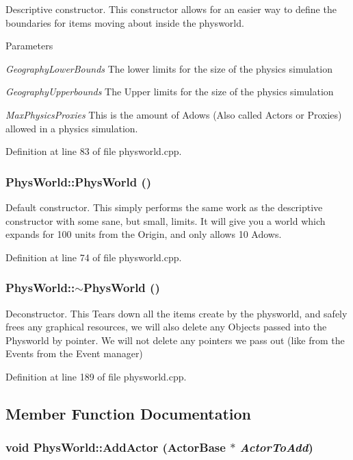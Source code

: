 Descriptive constructor. This constructor allows for an easier way to define the boundaries for items moving about inside the physworld. 
\begin{DoxyParams}{Parameters}
\item[{\em GeographyLowerBounds}]The lower limits for the size of the physics simulation \item[{\em GeographyUpperbounds}]The Upper limits for the size of the physics simulation \item[{\em MaxPhysicsProxies}]This is the amount of Adows (Also called Actors or Proxies) allowed in a physics simulation. \end{DoxyParams}


Definition at line 83 of file physworld.cpp.\hypertarget{classPhysWorld_a6ded8026b0cd72e7877830698197adf0}{
\subsubsection[{PhysWorld}]{\setlength{\rightskip}{0pt plus 5cm}PhysWorld::PhysWorld ()}}
\label{db/df5/classPhysWorld_a6ded8026b0cd72e7877830698197adf0}


Default constructor. This simply performs the same work as the descriptive constructor with some sane, but small, limits. It will give you a world which expands for 100 units from the Origin, and only allows 10 Adows. 

Definition at line 74 of file physworld.cpp.\hypertarget{classPhysWorld_acdfe3b4c1c236860dc7dff945cfe5b07}{
\subsubsection[{$\sim$PhysWorld}]{\setlength{\rightskip}{0pt plus 5cm}PhysWorld::$\sim$PhysWorld ()}}
\label{db/df5/classPhysWorld_acdfe3b4c1c236860dc7dff945cfe5b07}


Deconstructor. This Tears down all the items create by the physworld, and safely frees any graphical resources, we will also delete any Objects passed into the Physworld by pointer. We will not delete any pointers we pass out (like from the Events from the Event manager) 

Definition at line 189 of file physworld.cpp.

\subsection{Member Function Documentation}
\hypertarget{classPhysWorld_ae490054b3e1c4c5aa69cb8e3b7bd2f29}{
\subsubsection[{AddActor}]{\setlength{\rightskip}{0pt plus 5cm}void PhysWorld::AddActor ({\bf ActorBase} $\ast$ {\em ActorToAdd})}}
\label{db/df5/classPhysWorld_ae490054b3e1c4c5aa69cb8e3b7bd2f29}


